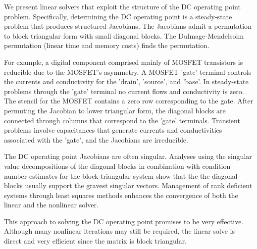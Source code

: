 \documentclass[10pt,fleqn]{article}
\begin{document}
We present linear solvers
that exploit the structure of the DC operating point problem.  Specifically,
determining the DC operating point is a steady-state problem that
produces structured Jacobians.  The Jacobians admit a permutation to
block triangular form with small diagonal blocks.  The Dulmage-Mendelsohn
permutation (linear time and memory costs) finds the permutation.

For example, a digital component comprised mainly of MOSFET transistors
is reducible due to the MOSFET's asymmetry.  A MOSFET 'gate' terminal
controls the currents and conductivity for the 'drain', 'source', 
and 'base'.  In steady-state problems through the 'gate' terminal
no current flows and conductivity is zero.  The stencil for the MOSFET
contains a zero row corresponding to the gate.  After permuting the
Jacobian  to lower triangular form, the diagonal blocks are connected
through columns that correspond to the 'gate' terminals.  Transient
problems involve capacitances that generate currents and conductivities
associated with the 'gate', and the Jacobians are irreducible.

The DC operating point Jacobians are often singular.  Analyses using
the singular value decompositions of the diagonal blocks in combination
with condition number estimates for the block triangular system show
that the the diagonal blocks usually support the gravest singular vectors.
Management of rank deficient systems through least squares methods
enhances the convergence of both the linear and the nonlinear solver.

This approach to solving the DC operating point promises to be very
effective.  Although many nonlinear iterations may still be required,
the linear solve is direct and very efficient since the matrix is
block triangular.


\nopagebreak
\scriptsize

\end{document}
